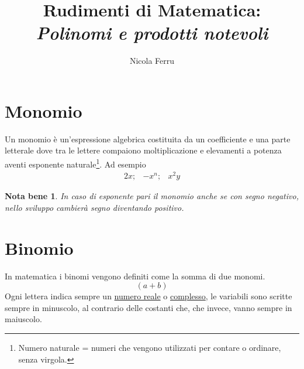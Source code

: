 \documentclass{article}
\title{Rudimenti di Matematica: \\ {\large\it Polinomi e prodotti notevoli}}
\author{Nicola Ferru}
\newtheorem{notab}{Nota bene}
\begin{document}
\maketitle

\section{Monomio}
\label{sec:monomio}

Un monomio è un'espressione algebrica costituita da un coefficiente e una parte letterale dove tra le lettere
compaiono moltiplicazione e elevamenti a potenza aventi esponente naturale\footnote{Numero naturale =
numeri che vengono utilizzati per contare o ordinare, senza virgola.}. Ad esempio
\begin{eqnarray}
  \label{eq:monomi}
  2x; & -x^n; & x^2y
\end{eqnarray}
\begin{notab}
  In caso di esponente pari il monomio anche se con segno negativo, nello sviluppo cambierà segno diventando
  positivo.
\end{notab}
\section{Binomio}
\label{sec:binomio}

In matematica i binomi vengono definiti come la somma di due monomi.
\begin{equation}
  \label{eq:a+b}
  (a+b)
\end{equation}
Ogni lettera indica sempre un \underline{numero reale} o \underline{complesso},
le variabili sono scritte sempre in minuscolo, al contrario delle costanti che, che invece,
vanno sempre in maiuscolo.
\end{document}
